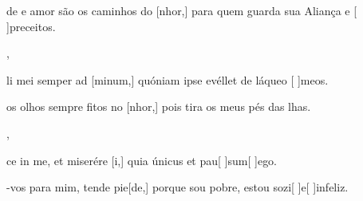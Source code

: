 {        {\item {}de e amor são os caminhos do [nhor,] para quem guarda sua Aliança e [ ]{pre}{cei}tos.},
    {\item {}li mei semper ad [minum,] quóniam ipse evéllet de láqueo [ ]{me}os.}%
        {\item {} os olhos sempre fitos no [nhor,] pois tira os meus pés das lhas.},
    {\item {}ce in me, et miserére [i,] quia únicus et pau[ ]{sum}[ ]{e}go.}%
        {\item {}-vos para mim, tende pie[de,] porque sou pobre, estou sozi[ ]{e}[ ]{in}feliz.}
}